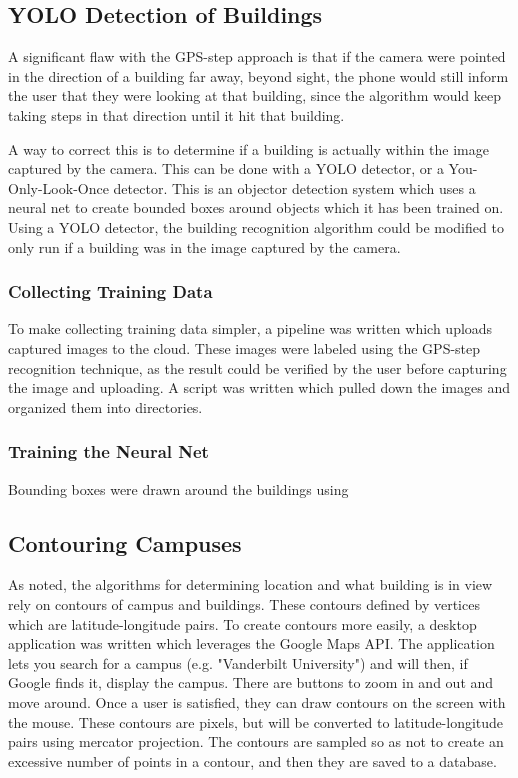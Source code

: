 \documentclass[12pt,journal,compsoc]{IEEEtran}
\begin{document}
\subsection{YOLO Detection of Buildings}

A significant flaw with the GPS-step approach is that if the camera were pointed in the direction of a building far away, beyond sight, the phone would still inform the user that they were looking at that building, since the algorithm would keep taking steps in that direction until it hit that building.

A way to correct this is to determine if a building is actually within the image captured by the camera. This can be done with a YOLO detector, or a You-Only-Look-Once detector. This is an objector detection system which uses a neural net to create bounded boxes around objects which it has been trained on. Using a YOLO detector, the building recognition algorithm could be modified to only run if a building was in the image captured by the camera.

\subsubsection{Collecting Training Data}

To make collecting training data simpler, a pipeline was written which uploads captured images to the cloud. These images were labeled using the GPS-step recognition technique, as the result could be verified by the user before capturing the image and uploading. A script was written which pulled down the images and organized them into directories.

\subsubsection{Training the Neural Net}

Bounding boxes were drawn around the buildings using 

\subsection{Contouring Campuses}

As noted, the algorithms for determining location and what building is in view rely on contours of campus and buildings. These contours defined by vertices which are latitude-longitude pairs. To create contours more easily, a desktop application was written which leverages the Google Maps API. The application lets you search for a campus (e.g. "Vanderbilt University") and will then, if Google finds it, display the campus. There are buttons to zoom in and out and move around. Once a user is satisfied, they can draw contours on the screen with the mouse. These contours are pixels, but will be converted to latitude-longitude pairs using mercator projection. The contours are sampled so as not to create an excessive number of points in a contour, and then they are saved to a database. 
\end{document}
